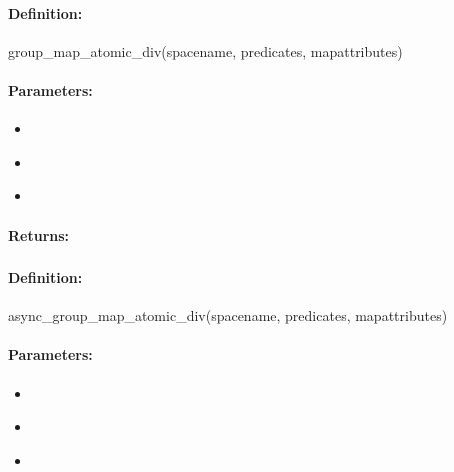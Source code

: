 \paragraph{Definition:}
\begin{rubycode}
group_map_atomic_div(spacename, predicates, mapattributes)
\end{rubycode}

\paragraph{Parameters:}
\begin{itemize}[noitemsep]
\item {}\\

\item {}\\

\item {}\\

\end{itemize}

\paragraph{Returns:}


\pagebreak
\subsubsection{}
\label{api:ruby:async_group_map_atomic_div}


\paragraph{Definition:}
\begin{rubycode}
async_group_map_atomic_div(spacename, predicates, mapattributes)
\end{rubycode}

\paragraph{Parameters:}
\begin{itemize}[noitemsep]
\item {}\\

\item {}\\

\item {}\\

\end{itemize}

